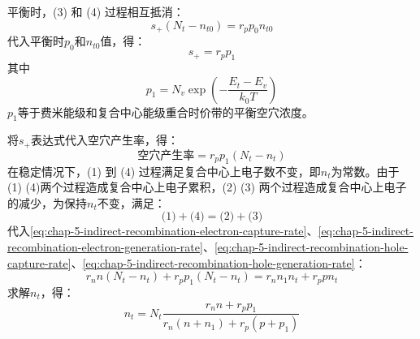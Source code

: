 平衡时，(3) 和 (4) 过程相互抵消：
\begin{equation}
    s_+(N_t-n_{t0})=r_pp_0n_{t0}
\end{equation}
代入平衡时$p_0$和$n_{t0}$值，得：
\begin{equation}
    s_+=r_pp_1
\end{equation}
其中
\begin{equation}
    p_1=N_v\exp{\left(-\frac{E_t-E_v}{k_0T}\right)}
\end{equation}
$p_1$等于费米能级和复合中心能级重合时价带的平衡空穴浓度。

将$s_+$表达式代入空穴产生率，得：
\begin{equation}
    \text{空穴产生率}=r_pp_1(N_t-n_t)\label{eq:chap-5-indirect-recombination-hole-generation-rate}
\end{equation}
在稳定情况下，(1) 到 (4) 过程满足复合中心上电子数不变，即$n_t$为常数。由于 (1)  (4)两个过程造成复合中心上电子累积，(2) (3) 两个过程造成复合中心上电子的减少，为保持$n_t$不变，满足：
\begin{equation}
    \text{(1)}+\text{(4)}=\text{(2)}+\text{(3)}
\end{equation}
代入\autoref{eq:chap-5-indirect-recombination-electron-capture-rate}、\autoref{eq:chap-5-indirect-recombination-electron-generation-rate}、\autoref{eq:chap-5-indirect-recombination-hole-capture-rate}、\autoref{eq:chap-5-indirect-recombination-hole-generation-rate}：
\begin{equation}
    r_nn(N_t-n_t)+r_pp_1(N_t-n_t)=r_nn_1n_t+r_ppn_t\label{eq:chap-5-indirect-recombination-center-electron-conecntration-equation}
\end{equation}
求解$n_t$，得：
\begin{equation}
    n_t=N_t\frac{r_nn+r_pp_1}{r_n(n+n_1)+r_p(p+p_1)}\label{eq:chap-5-indirect-recombination-center-electron-conecntration}
\end{equation}

